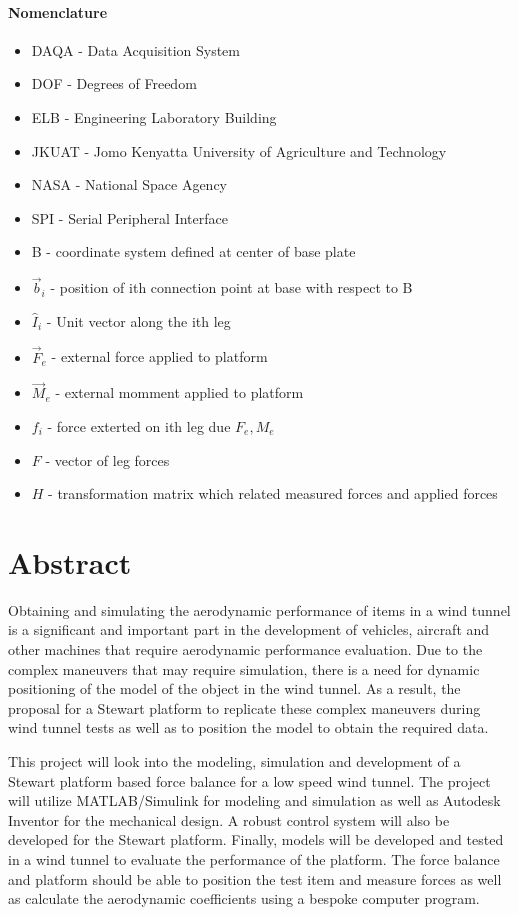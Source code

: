 \paragraph{Nomenclature}
\begin{itemize}
\item DAQA - Data Acquisition System
\item DOF - Degrees of Freedom
\item ELB - Engineering Laboratory Building
\item JKUAT - Jomo Kenyatta University of Agriculture and Technology
\item NASA - National Space Agency
\item SPI - Serial Peripheral Interface
\item B - coordinate system defined at center of base plate
\item $\vec{b}_i$ - position of ith connection point at base with respect to B
\item $\hat{I}_i$ - Unit vector along the ith leg
\item $\vec{F}_e$ - external force applied to platform
\item $\vec{M}_e$ - external momment applied to platform
\item $f_i$ - force exterted on ith leg due $F_e, M_e$
\item $F$ - vector of leg forces
\item $H$ - transformation matrix which related measured forces and applied forces 
\end{itemize}
\pagebreak
{}

\section*{Abstract}
\label{sec:Abstract}
Obtaining and simulating the aerodynamic performance of items in a wind tunnel is a
significant and important part in the development of vehicles, aircraft and other machines
that require aerodynamic performance evaluation. Due to the complex maneuvers that may require simulation, there is a need for dynamic positioning of the model of the object in the wind tunnel. As a result, the proposal for a Stewart platform to replicate these complex maneuvers during wind tunnel tests as well as to position the model to obtain the required data.

This project will look into the modeling, simulation and development of a Stewart
platform based force balance for a low speed wind tunnel. The project will utilize
MATLAB/Simulink for modeling and simulation as well as Autodesk Inventor for the mechanical
design. A robust control system will also be developed for the Stewart platform.
Finally, models will be developed and tested in a wind tunnel to evaluate the performance
of the platform. The force balance and platform should be able to position the test
item and measure forces as well as calculate the aerodynamic coefficients using a bespoke computer program.




